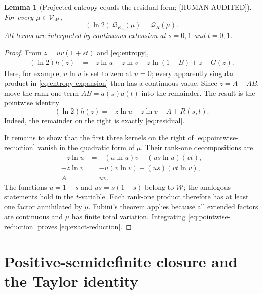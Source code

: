 \documentclass[11pt]{article}
\theoremstyle{plain}
\newtheorem{lemma}[theorem]{Lemma}
\theoremstyle{definition}
\theoremstyle{remark}
\newcommand{\M}{\mathcal M}
\newcommand{\W}{\mathcal W}
\newcommand{\V}{\mathcal V}
\newcommand{\QF}{\mathcal Q}
\newcommand{\status}[1]{\textnormal{\textsf{\footnotesize[#1]}}}
\newcommand{\HumanAudited}{\status{HUMAN-AUDITED}}
\begin{document}
\begin{lemma}[Projected entropy equals the residual form;
\HumanAudited]
\label{lem:reduction}
For every \(\mu\in\V_{\M}\),
\begin{equation}
  (\ln2)\,\QF_{K_{\mathrm L}}(\mu)=\QF_R(\mu).
  \label{eq:exact-reduction}
\end{equation}
All terms are interpreted by continuous extension at \(s=0,1\) and
\(t=0,1\).
\end{lemma}

\begin{proof}
From \(z=uv(1+st)\) and \eqref{eq:entropy},
\begin{align}
  (\ln2)h(z)
  &=-z\ln u-z\ln v-z\ln(1+B)+z-G(z).
  \label{eq:entropy-expansion}
\end{align}
Here, for example, \(u\ln u\) is set to zero at \(u=0\); every apparently
singular product in \eqref{eq:entropy-expansion} then has a continuous value.
Since \(z=A+AB\), move the rank-one term \(AB=a(s)a(t)\) into the remainder.
The result is the pointwise identity
\begin{equation}
  (\ln2)h(z)=-z\ln u-z\ln v+A+R(s,t).
  \label{eq:pointwise-reduction}
\end{equation}
Indeed, the remainder on the right is exactly \eqref{eq:residual}.

It remains to show that the first three kernels on the right of
\eqref{eq:pointwise-reduction} vanish in the quadratic form of \(\mu\).  Their
rank-one decompositions are
\begin{align*}
  -z\ln u
    &=-(u\ln u)v-(us\ln u)(vt),\\
  -z\ln v
    &=-u(v\ln v)-(us)(vt\ln v),\\
  A&=uv.
\end{align*}
The functions \(u=1-s\) and \(us=s(1-s)\) belong to \(\W\); the analogous
statements hold in the \(t\)-variable.  Each rank-one product therefore has at
least one factor annihilated by \(\mu\).  Fubini's theorem
\cite[Chapter~8]{rudin} applies because all extended factors are continuous
and \(\mu\) has finite total variation.
Integrating \eqref{eq:pointwise-reduction} proves
\eqref{eq:exact-reduction}.
\end{proof}

\section{Positive-semidefinite closure and the Taylor identity}
\label{sec:taylor}
\end{document}
